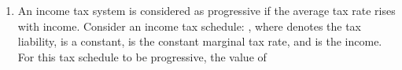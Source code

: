 \documentclass[12pt]{article}
\theoremstyle{remark}
\begin{document}
\begin{enumerate}
\hfill{}
\item  An income tax system is considered as progressive if the average tax rate rises with income. Consider an income tax schedule: 
, where  denotes the tax liability,  is a constant,  is the constant marginal tax rate, and  is the income. For this tax schedule to be progressive, the value of  \newline
\begin{enumerate} 
\end{enumerate}
\end{enumerate}
\end{document}
